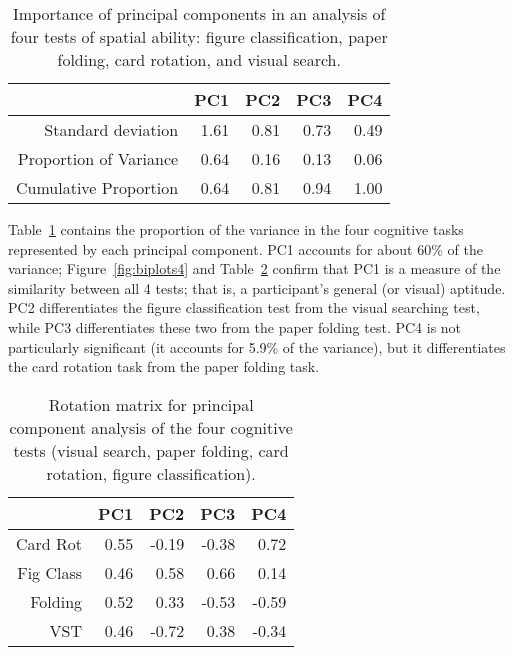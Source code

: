 \documentclass[journal]{vgtc}\usepackage[]{graphicx}\usepackage[]{color}
\begin{document}
\begin{table}[htb]
\centering
\caption{Importance of principal components in an analysis of four tests of spatial ability: figure classification, paper folding, card rotation, and visual search.\label{tab:PCAvariance4}} 
{\footnotesize
\begin{tabular}{rrrrr}
  \hline
 & PC1 & PC2 & PC3 & PC4 \\ 
  \hline
Standard deviation & 1.61 & 0.81 & 0.73 & 0.49 \\ 
  Proportion of Variance & 0.64 & 0.16 & 0.13 & 0.06 \\ 
  Cumulative Proportion & 0.64 & 0.81 & 0.94 & 1.00 \\ 
   \hline
\end{tabular}
}
\end{table}

Table~\ref{tab:PCAvariance4} contains the proportion of the variance in the four cognitive tasks represented by each principal component. PC1 accounts for about 60\% of the variance; Figure~\ref{fig:biplots4} and Table~\ref{tab:PCArotation4} confirm that PC1 is a measure of the similarity between all 4 tests; that is, a participant's general (or visual) aptitude. PC2 differentiates the figure classification test from the visual searching test, while PC3 differentiates these two from the paper folding test. PC4 is not particularly significant (it accounts for 5.9\% of the variance), but it differentiates the card rotation task from the paper folding task.

\begin{table}[htb]
\centering
\caption{Rotation matrix for principal component analysis of the four cognitive tests (visual search, paper folding, card rotation, figure classification).\label{tab:PCArotation4}} 
{\footnotesize
\begin{tabular}{rrrrr}
  \hline
 & PC1 & PC2 & PC3 & PC4 \\ 
  \hline
Card Rot & 0.55 & -0.19 & -0.38 & 0.72 \\ 
  Fig Class & 0.46 & 0.58 & 0.66 & 0.14 \\ 
  Folding & 0.52 & 0.33 & -0.53 & -0.59 \\ 
  VST & 0.46 & -0.72 & 0.38 & -0.34 \\ 
   \hline
\end{tabular}
}
\end{table}
\end{document}
